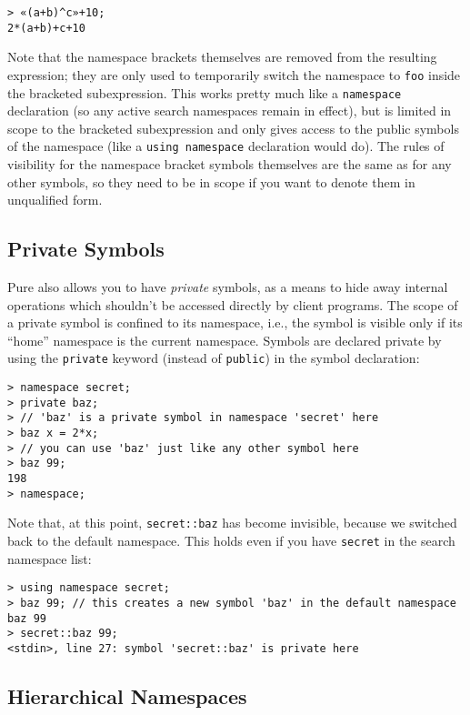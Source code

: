 \documentclass[a4paper,12pt]{article}
\begin{document}
\begin{verbatim}
> «(a+b)^c»+10;
2*(a+b)+c+10
\end{verbatim}

Note that the namespace brackets themselves are removed from the resulting expression; they are only used to temporarily switch the namespace to \verb|foo| inside the bracketed subexpression. This works pretty much like a \lstinline|namespace| declaration (so any active search namespaces remain in effect), but is limited in scope to the bracketed subexpression and only gives access to the public symbols of the namespace (like a \lstinline|using namespace| declaration would do). The rules of visibility for the namespace bracket symbols themselves are the same as for any other symbols, so they need to be in scope if you want to denote them in unqualified form.

\subsection{Private Symbols}
\label{Private}

Pure also allows you to have \emph{private} symbols, as a means to hide away internal operations which shouldn't be accessed directly by client programs. The scope of a private symbol is confined to its namespace, i.e., the symbol is visible only if its ``home'' namespace is the current namespace. Symbols are declared private by using the \lstinline{private} keyword (instead of \lstinline{public}) in the symbol declaration:

\begin{lstlisting}
> namespace secret;
> private baz;
> // 'baz' is a private symbol in namespace 'secret' here
> baz x = 2*x;
> // you can use 'baz' just like any other symbol here
> baz 99;
198
> namespace;
\end{lstlisting}

Note that, at this point, \verb|secret::baz| has become invisible, because we switched back to the default namespace. This holds even if you have \verb|secret| in the search namespace list:

\begin{lstlisting}
> using namespace secret;
> baz 99; // this creates a new symbol 'baz' in the default namespace
baz 99
> secret::baz 99;
<stdin>, line 27: symbol 'secret::baz' is private here
\end{lstlisting}

\subsection{Hierarchical Namespaces}
\label{Hierarchical}
\end{document}
